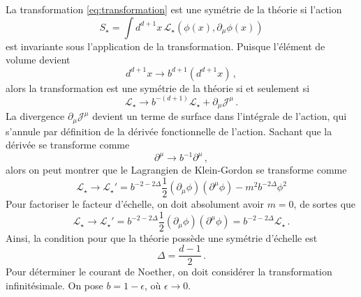 \documentclass{article}
\numberwithin{equation}{section}
\theoremstyle{solution}
\begin{document}
La transformation \eqref{eq:transformation} est une symétrie de la théorie si l'action 
\begin{equation}\label{eq:action}
        S_\star = \int d^{d+1}x\, \mathcal{L}_\star(\phi(x), \partial_{\mu}\phi(x))
\end{equation} 
est invariante sous l'application de la transformation. Puisque l'élément de volume devient
\begin{equation}
        d^{d+1}x \rightarrow b^{d+1}(d^{d+1}x)\, ,
\end{equation} 
alors la transformation est une symétrie de la théorie si et seulement si
\begin{equation}
       \mathcal{L}_{\star} \rightarrow b^{-(d+1)}\mathcal{L_{\star}} + \partial_{\mu}\mathcal{J}^{\mu}\, .
\end{equation} 
La divergence $\partial_{\mu}\mathcal{J}^{\mu}$ devient un terme de surface dans l'intégrale de l'action, qui 
s'annule par définition de la dérivée fonctionnelle de l'action.
Sachant que la dérivée se transforme comme
\begin{equation}
        \partial^{\mu} \rightarrow b^{-1}\partial^{\mu}\, ,
\end{equation}
alors on peut montrer que le Lagrangien de Klein-Gordon se transforme comme
\begin{equation}\label{eq:lagrangian transform}
        \mathcal{L}_\star \rightarrow  \mathcal{L}_\star' = b^{-2-2\Delta}\frac{1}{2}(\partial_{\mu}\phi)(\partial^\mu \phi) -m^2b^{-2\Delta}\phi^2 %
\end{equation} 
Pour factoriser le facteur d'échelle, on doit absolument avoir $\boxed{m=0}$, de sortes que
\begin{equation}\label{eq:lagrangian transform}
        \mathcal{L}_\star \rightarrow  \mathcal{L}_\star' = b^{-2-2\Delta}\frac{1}{2}(\partial_{\mu}\phi)(\partial^\mu \phi) = b^{-2-2\Delta}\mathcal{L}_\star\, .
\end{equation} 
Ainsi, la condition pour que la théorie possède une symétrie d'échelle est
\begin{equation}\label{eq:Delta}
        \boxed{\Delta = \frac{d - 1}{2}}\, .
\end{equation} 
Pour déterminer le courant de Noether, on doit considérer la transformation infinitésimale. On pose $b = 1 - \epsilon$, où $\epsilon \rightarrow 0$. 
\end{document}
